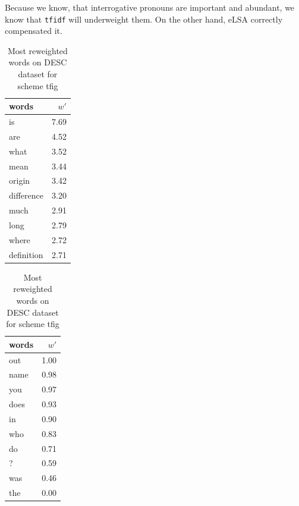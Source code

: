     Because we know, that interrogative pronouns are important and abundant, we know that \texttt{tfidf} will underweight them.
    On the other hand, eLSA correctly compensated it.
    
    

\begin{table}[H]
    \centering
    \begin{minipage}{.4\linewidth}
      \centering
        \begin{tabular}{lr}
\toprule
      words &  $w'$ \\
\midrule
         is &  7.69 \\
        are &  4.52 \\
       what &  3.52 \\
       mean &  3.44 \\
     origin &  3.42 \\
 difference &  3.20 \\
       much &  2.91 \\
       long &  2.79 \\
      where &  2.72 \\
 definition &  2.71 \\
\bottomrule
\end{tabular}

    \end{minipage}
    \begin{minipage}{.4\linewidth}
      \centering
        \begin{tabular}{lr}
\toprule
words &  $w'$ \\
\midrule
  out &  1.00 \\
 name &  0.98 \\
  you &  0.97 \\
 does &  0.93 \\
   in &  0.90 \\
  who &  0.83 \\
   do &  0.71 \\
    ? &  0.59 \\
  was &  0.46 \\
  the &  0.00 \\
\bottomrule
\end{tabular}

    \end{minipage} 
    \caption{Most reweighted words on DESC dataset for scheme tfig}
    \label{tab:words:TREC:tfig}
\end{table}

